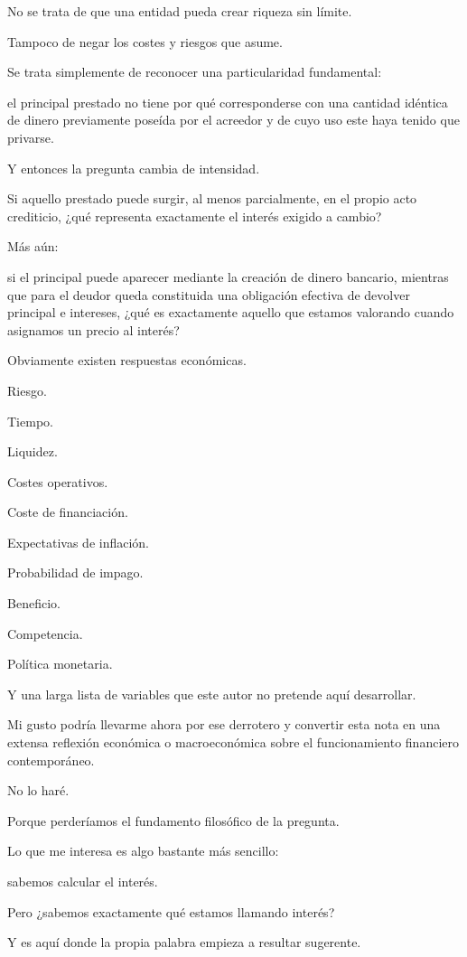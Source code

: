 \documentclass[12pt,a4paper]{article}
\begin{document}
No se trata de que una entidad pueda crear riqueza sin límite.

Tampoco de negar los costes y riesgos que asume.

Se trata simplemente de reconocer una particularidad fundamental:

el principal prestado no tiene por qué corresponderse con una cantidad idéntica de dinero previamente poseída por el acreedor y de cuyo uso este haya tenido que privarse.

Y entonces la pregunta cambia de intensidad.

Si aquello prestado puede surgir, al menos parcialmente, en el propio acto crediticio, ¿qué representa exactamente el interés exigido a cambio?

Más aún:

si el principal puede aparecer mediante la creación de dinero bancario, mientras que para el deudor queda constituida una obligación efectiva de devolver principal e intereses, ¿qué es exactamente aquello que estamos valorando cuando asignamos un precio al interés?

Obviamente existen respuestas económicas.

Riesgo.

Tiempo.

Liquidez.

Costes operativos.

Coste de financiación.

Expectativas de inflación.

Probabilidad de impago.

Beneficio.

Competencia.

Política monetaria.

Y una larga lista de variables que este autor no pretende aquí desarrollar.

Mi gusto podría llevarme ahora por ese derrotero y convertir esta nota en una extensa reflexión económica o macroeconómica sobre el funcionamiento financiero contemporáneo.

No lo haré.

Porque perderíamos el fundamento filosófico de la pregunta.

Lo que me interesa es algo bastante más sencillo:

sabemos calcular el interés.

Pero ¿sabemos exactamente qué estamos llamando interés?

Y es aquí donde la propia palabra empieza a resultar sugerente.
\end{document}
